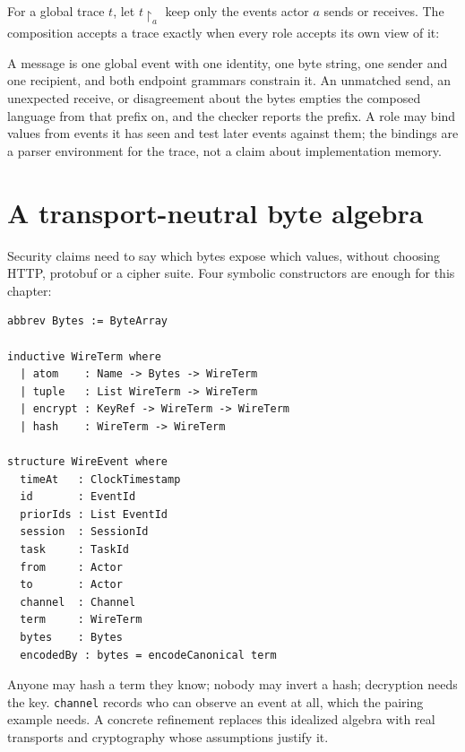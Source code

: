For a global trace $t$, let $t\!\upharpoonright_a$ keep only the events actor
$a$ sends or receives. The composition accepts a trace exactly when every role
accepts its own view of it:


A message is one global event with one identity, one byte string, one sender and
one recipient, and both endpoint grammars constrain it. An unmatched send, an
unexpected receive, or disagreement about the bytes empties the composed language
from that prefix on, and the checker reports the prefix. A role may bind values
from events it has seen and test later events against them; the bindings are a
parser environment for the trace, not a claim about implementation memory.

\section{A transport-neutral byte algebra}

Security claims need to say which bytes expose which values, without choosing
HTTP, protobuf or a cipher suite. Four symbolic constructors are enough for this
chapter:

\begin{lstlisting}
abbrev Bytes := ByteArray

inductive WireTerm where
  | atom    : Name -> Bytes -> WireTerm
  | tuple   : List WireTerm -> WireTerm
  | encrypt : KeyRef -> WireTerm -> WireTerm
  | hash    : WireTerm -> WireTerm

structure WireEvent where
  timeAt   : ClockTimestamp
  id       : EventId
  priorIds : List EventId
  session  : SessionId
  task     : TaskId
  from     : Actor
  to       : Actor
  channel  : Channel
  term     : WireTerm
  bytes    : Bytes
  encodedBy : bytes = encodeCanonical term
\end{lstlisting}

Anyone may hash a term they know; nobody may invert a hash; decryption needs the
key. \texttt{channel} records who can observe an event at all, which the pairing
example needs. A concrete refinement replaces this idealized algebra with real
transports and cryptography whose assumptions justify it.

